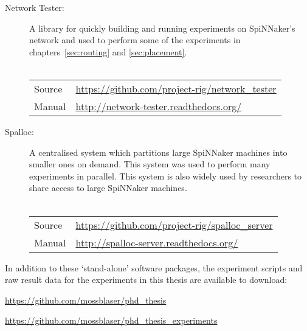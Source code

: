\begin{description}
		\item [Network Tester:] A library for quickly building and running
		experiments on SpiNNaker's network and used to perform some of the
		experiments in chapters~\ref{sec:routing} and \ref{sec:placement}.
		\\
		\vspace*{-1.25em}
		\\
		\begin{tabular}{ll}
			Source & \url{https://github.com/project-rig/network_tester} \\
			Manual & \url{http://network-tester.readthedocs.org/} \\
		\end{tabular}
		
		\item [Spalloc:] A centralised system which partitions large SpiNNaker
		machines into smaller ones on demand. This system was used to perform many
		experiments in parallel. This system is also widely used by researchers to
		share access to large SpiNNaker machines.
		\\
		\vspace*{-1.25em}
		\\
		\begin{tabular}{ll}
			Source & \url{https://github.com/project-rig/spalloc_server} \\
			Manual & \url{http://spalloc-server.readthedocs.org/} \\
		\end{tabular}
		
	\end{description}

In addition to these `stand-alone' software packages, the experiment scripts
and raw result data for the experiments in this thesis are available to
download:

\url{https://github.com/mossblaser/phd_thesis}

\url{https://github.com/mossblaser/phd_thesis_experiments}

